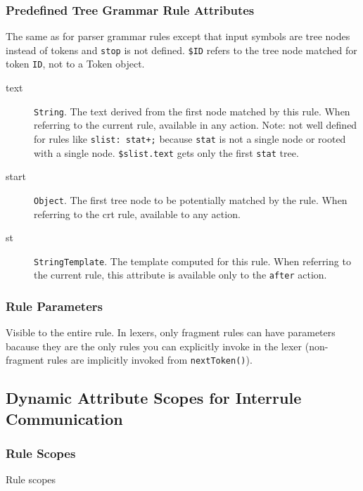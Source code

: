 \subsubsection{Predefined Tree Grammar Rule Attributes}

The same as for parser grammar rules
except that input symbols are tree nodes instead of tokens
and \verb=stop= is not defined.
\verb=$ID= refers to the tree node matched for token \verb=ID=,
not to a Token object.

\begin{description}
\item[text] \verb=String=.
The text derived from the first node matched by this rule.
When referring to the current rule, available in any action.
Note: not well defined for rules like \verb=slist: stat+;=
because \verb=stat= is not a single node or rooted with a single node.
\verb=$slist.text= gets only the first \verb=stat= tree.

\item[start] \verb=Object=.
The first tree node to be potentially matched by the rule.
When referring to the crt rule, available to any action.

\item[st] \verb=StringTemplate=.
The template computed for this rule.
When referring to the current rule,
this attribute is available only to the \verb=after= action.
\end{description}

\subsubsection{Rule Parameters}
Visible to the entire rule.
In lexers, only fragment rules can have parameters
bacause they are the only rules you can explicitly invoke in the lexer
(non-fragment rules are implicitly invoked from \verb=nextToken()=).


\subsection{Dynamic Attribute Scopes for Interrule Communication}
\label{subsec:dynam-attrib-scopes}

\subsubsection{Rule Scopes}

\begin{program}
\caption{Rule scopes\label{aa:rule-scopes}}
\end{program}


